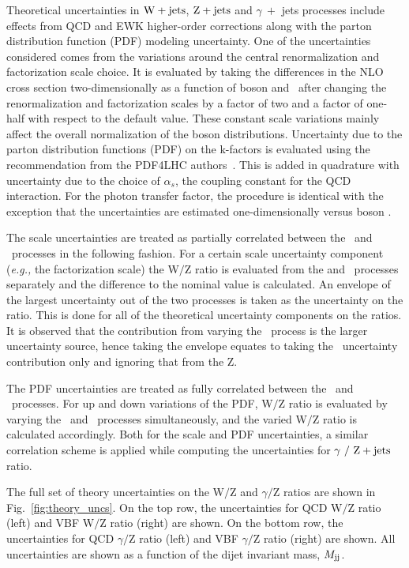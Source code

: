Theoretical uncertainties in $\mathrm{W}+\textrm{jets}$, $\mathrm{Z}+\textrm{jets}$ and $\gamma \ +$ jets processes include effects from QCD and EWK higher-order
corrections along with the parton distribution function (PDF) modeling uncertainty. One of the uncertainties considered comes from the
variations around the central renormalization and factorization scale choice. It is evaluated by taking the differences in the NLO cross
section two-dimensionally as a function of boson \pt and \mjj~after changing the renormalization and factorization scales by a factor of two 
and a factor of one-half with respect to the default value. These constant scale variations mainly affect the
overall normalization of the boson \pt distributions. 
Uncertainty due to the parton distribution functions (PDF) on the k-factors
is evaluated using the recommendation from the PDF4LHC authors~\cite{paper:PDF4LHC}. 
This is added in quadrature with uncertainty due to the choice of $\alpha_{s}$, the coupling constant for the QCD interaction.
For the photon transfer factor, the procedure is identical with the exception that the uncertainties are estimated one-dimensionally versus boson \pt{}.

The scale uncertainties are treated as partially correlated between the \Zjets~and \Wjets~processes in the following fashion. 
For a certain scale uncertainty component (\textit{e.g.,} the factorization scale) the W$/$Z ratio is evaluated from the \Zjets{} and \Wjets~processes 
separately and the difference to the nominal value is calculated.
An envelope of the largest uncertainty out of the two processes is taken as the uncertainty on the ratio.
This is done for all of the theoretical uncertainty components on the ratios.
It is observed that the contribution from varying the \Wjets~process is the larger uncertainty source,
hence taking the envelope equates to taking the \Wjets~uncertainty contribution only and ignoring that from the Z.

The PDF uncertainties are treated as fully correlated between the \Zjets~and \Wjets~processes. For up and down variations of the PDF, W$/$Z ratio is 
evaluated by varying the \Wjets~and \Zjets~processes simultaneously, and the varied W$/$Z ratio is calculated accordingly. 
Both for the scale and PDF uncertainties, a similar correlation scheme is applied while computing the uncertainties for $\gamma~/~\mathrm{Z}+\textrm{jets}$ ratio.

The full set of theory uncertainties on the W$/$Z and $\gamma/$Z ratios are shown in Fig.~\ref{fig:theory_uncs}. On the top row,
the uncertainties for QCD W$/$Z ratio (left) and VBF W$/$Z ratio (right) are shown. On the bottom row,
the uncertainties for QCD $\gamma/$Z ratio (left) and VBF $\gamma/$Z ratio (right) are shown. All uncertainties are shown as a function
of the dijet invariant mass, $M_{\textrm{jj}}$. 

